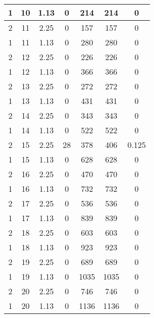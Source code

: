 \documentclass[letterpaper, 12pt]{article}
\begin{document}
\begin{longtable}{|c|c|c|c|c|c|c|}
\hline
1 & 10 & 1.13 & 0 & 214 & 214 & 0 \\
\hline
2 & 11 & 2.25 & 0 & 157 & 157 & 0 \\
\hline
1 & 11 & 1.13 & 0 & 280 & 280 & 0 \\
\hline
2 & 12 & 2.25 & 0 & 226 & 226 & 0 \\
\hline
1 & 12 & 1.13 & 0 & 366 & 366 & 0 \\
\hline
2 & 13 & 2.25 & 0 & 272 & 272 & 0 \\
\hline
1 & 13 & 1.13 & 0 & 431 & 431 & 0 \\
\hline
2 & 14 & 2.25 & 0 & 343 & 343 & 0 \\
\hline
1 & 14 & 1.13 & 0 & 522 & 522 & 0 \\
\hline
2 & 15 & 2.25 & 28 & 378 & 406 & 0.125 \\
\hline
1 & 15 & 1.13 & 0 & 628 & 628 & 0 \\
\hline
2 & 16 & 2.25 & 0 & 470 & 470 & 0 \\
\hline
1 & 16 & 1.13 & 0 & 732 & 732 & 0 \\
\hline
2 & 17 & 2.25 & 0 & 536 & 536 & 0 \\
\hline
1 & 17 & 1.13 & 0 & 839 & 839 & 0 \\
\hline
2 & 18 & 2.25 & 0 & 603 & 603 & 0 \\
\hline
1 & 18 & 1.13 & 0 & 923 & 923 & 0 \\
\hline
2 & 19 & 2.25 & 0 & 689 & 689 & 0 \\
\hline
1 & 19 & 1.13 & 0 & 1035 & 1035 & 0 \\
\hline
2 & 20 & 2.25 & 0 & 746 & 746 & 0 \\
\hline
1 & 20 & 1.13 & 0 & 1136 & 1136 & 0 \\
\hline
\end{longtable}
\end{document}

